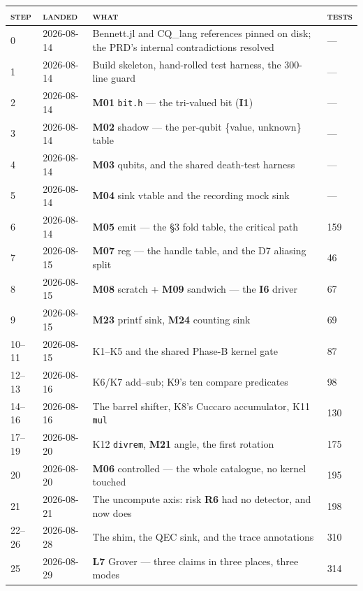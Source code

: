 \vspace{4pt}
\begin{longtable}{@{}p{15mm}p{17mm}p{72mm}p{24mm}@{}}
\toprule
\textsc{step} & \textsc{landed} & \textsc{what} & \textsc{tests}\\
\midrule
\endhead
0     & 2026-08-14 & Bennett.jl and CQ\_lang references pinned on disk; the PRD's internal contradictions resolved & ---\\
1     & 2026-08-14 & Build skeleton, hand-rolled test harness, the 300-line guard & ---\\
2     & 2026-08-14 & \textbf{M01} \texttt{bit.h} --- the tri-valued bit (\textbf{I1}) & ---\\
3     & 2026-08-14 & \textbf{M02} shadow --- the per-qubit \{value, unknown\} table & ---\\
4     & 2026-08-14 & \textbf{M03} qubits, and the shared death-test harness & ---\\
5     & 2026-08-14 & \textbf{M04} sink vtable and the recording mock sink & ---\\
6     & 2026-08-14 & \textbf{M05} emit --- the §3 fold table, the critical path & 159\\
7     & 2026-08-15 & \textbf{M07} reg --- the handle table, and the D7 aliasing split & 46\\
8     & 2026-08-15 & \textbf{M08} scratch + \textbf{M09} sandwich --- the \textbf{I6} driver & 67\\
9     & 2026-08-15 & \textbf{M23} printf sink, \textbf{M24} counting sink & 69\\
10--11 & 2026-08-15 & K1--K5 and the shared Phase-B kernel gate & 87\\
12--13 & 2026-08-16 & K6/K7 add--sub; K9's ten compare predicates & 98\\
14--16 & 2026-08-16 & The barrel shifter, K8's Cuccaro accumulator, K11 \texttt{mul} & 130\\
17--19 & 2026-08-20 & K12 \texttt{divrem}, \textbf{M21} angle, the first rotation & 175\\
20    & 2026-08-20 & \textbf{M06} controlled --- the whole catalogue, no kernel touched & 195\\
21    & 2026-08-21 & The uncompute axis: risk \textbf{R6} had no detector, and now does & 198\\
22--26 & 2026-08-28 & The shim, the QEC sink, and the trace annotations & 310\\
25    & 2026-08-29 & \textbf{L7} Grover --- three claims in three places, three modes & 314\\

\end{longtable}
